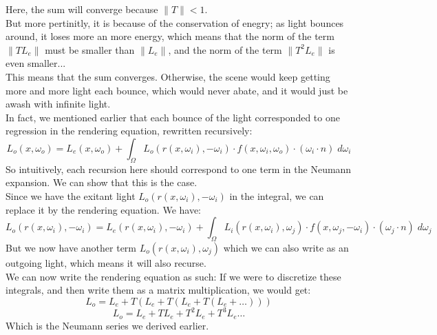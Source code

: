 \documentclass[12pt]{article}
\begin{document}
Here, the sum will converge because $\|T\| < 1$. \\
But more pertinitly, it is because of the conservation
of enegry; as light bounces around,
it loses more an more energy, which
means that the norm of the term $\|T L_e\|$
must be smaller than $\|L_e\|$,
and the norm of the term $\|T^2 L_e\|$ is even smaller... \\
This means that the sum converges.
Otherwise, the scene would keep getting more and more
light each bounce, which would never abate,
and it would just be awash with infinite light. \\

In fact, we mentioned earlier that each bounce of
the light corresponded to one regression in the rendering
equation, rewritten recursively:
\[ L_{o}(x, \omega_o)
= L_{e}(x, \omega_o)
+ \int_\Omega L_o(r(x, \omega_i), -\omega_i)  \cdot
f(x, \omega_i, \omega_o) \cdot
(\omega_i \cdot n) \; d\omega_i \]
So intuitively, each recursion here should correspond
to one term in the Neumann expansion.
We can show that this is the case. \\
Since we have the exitant light 
$L_o(r(x, \omega_i), -\omega_i)$
in the integral, we can replace it
by the rendering equation.
We have:
\[ L_o(r(x, \omega_i), -\omega_i)
= L_{e}(r(x, \omega_i), -\omega_i)
+ \int_\Omega L_i(r(x, \omega_i), \omega_j) \cdot
f(x, \omega_j, -\omega_i) \cdot
(\omega_j \cdot n) \; d\omega_j \]
But we now have another term
$L_o(r(x, \omega_i), \omega_j)$
which we can also write as an outgoing light,
which means it will also recurse. \\
We can now write the rendering equation as such:
If we were to discretize these integrals,
and then write them as a matrix multiplication,
we would get:
\[ L_o = L_e + T( L_e + T( L_e + T (L_e + \dots))) \]
\[ L_o = L_e + TL_e + T^2L_e + T^3L_e \dots \]
Which is the Neumann series we derived earlier. \\

\newpage
\end{document}
